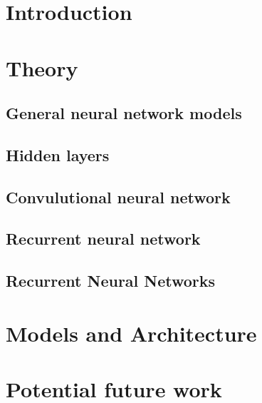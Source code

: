 \documentclass[a4paper]{article}
\begin{document}
\maketitle

\newpage
\tableofcontents
\newpage

\section{Introduction}


\section{Theory}
\subsection{General neural network models}


\subsection{Hidden layers}


\subsection{Convulutional neural network}



\subsection{Recurrent neural network}



\subsection{Recurrent Neural Networks}






\section{Models and Architecture}


\section{Potential future work}


{}

\end{document}
